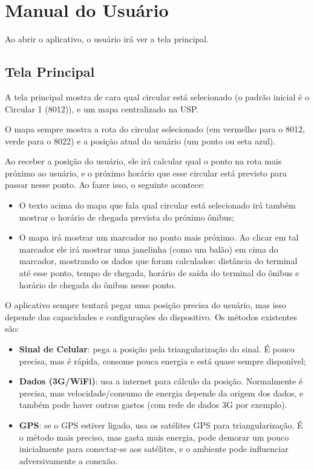 




\cabecalho

\section{Manual do Usuário}
Ao abrir o aplicativo, o usuário irá ver a tela principal. 

\subsection{Tela Principal}
A tela principal mostra de cara qual circular está selecionado (o padrão inicial é o Circular 1 (8012)),
e um mapa centralizado na USP.

O mapa sempre mostra a rota do circular selecionado (em vermelho para o 8012, verde para o 8022) e a posição
atual do usuário (um ponto ou seta azul).

Ao receber a posição do usuário, ele irá calcular qual o ponto na rota mais próximo ao usuário, e o próximo horário
que esse circular está previsto para passar nesse ponto. Ao fazer isso, o seguinte acontece:
\begin{itemize}
    \item O texto acima do mapa que fala qual circular está selecionado
        irá também mostrar o horário de chegada prevista do próximo ônibus;
    \item O mapa irá mostrar um marcador no ponto mais próximo. Ao clicar em tal marcador ele irá mostrar
        uma janelinha (como um balão) em cima do marcador, mostrando os dados que foram calculados: distância
        do terminal até esse ponto, tempo de chegada, horário de saída do terminal do ônibus e horário de chegada
        do ônibus nesse ponto.
\end{itemize}

O aplicativo sempre tentará pegar uma posição precisa do usuário, mas isso depende das capacidades e configurações
do dispositivo. Os métodos existentes são:
\begin{itemize}
    \item \textbf{Sinal de Celular}: pega a posição pela triangularização do sinal. É pouco precisa, mas é rápida,
        consome pouca energia e está quase sempre disponível;
    \item \textbf{Dados (3G/WiFi)}: usa a internet para cálculo da posição. Normalmente é precisa, mas velocidade/consumo
        de energia depende da origem dos dados, e também pode haver outros gastos (com rede de dados 3G por exemplo).
    \item \textbf{GPS}: se o GPS estiver ligado, usa os satélites GPS para triangularização. É o método mais preciso,
        mas gasta mais energia, pode demorar um pouco inicialmente para conectar-se aos satélites, e o ambiente
        pode influenciar adversivamente a conexão.
\end{itemize}

